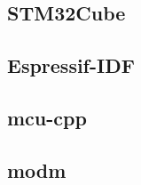 \subsection{STM32Cube}
\label{sec:stm32cube}



\subsection{Espressif-IDF}
\label{sec:esp_idf}



\subsection{mcu-cpp}
\label{sec:mcu_cpp}



\subsection{modm}
\label{sec:modm}


























